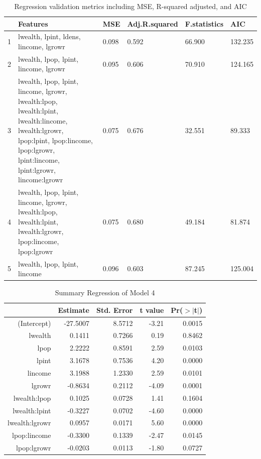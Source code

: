 \documentclass[11pt]{article}\usepackage[]{graphicx}\usepackage[]{color}
\begin{document}
\begin{center}
\begin{table}[ht]
\centering
\begin{tabular}{rp{2in}llll}
  \hline
 & Features & MSE & Adj.R.squared & F.statistics & AIC \\ 
  \hline
1 & lwealth, lpint, ldens, lincome, lgrowr & 0.098 & 0.592 & 66.900 & 132.235 \\ 
  2 & lwealth, lpop, lpint, lincome, lgrowr & 0.095 & 0.606 & 70.910 & 124.165 \\ 
  3 & lwealth, lpop, lpint, lincome, lgrowr, lwealth:lpop, lwealth:lpint, lwealth:lincome, lwealth:lgrowr, lpop:lpint, lpop:lincome, lpop:lgrowr, lpint:lincome, lpint:lgrowr, lincome:lgrowr & 0.075 & 0.676 & 32.551 & 89.333 \\ 
  4 & lwealth, lpop, lpint, lincome, lgrowr, lwealth:lpop, lwealth:lpint, lwealth:lgrowr, lpop:lincome, lpop:lgrowr & 0.075 & 0.680 & 49.184 & 81.874 \\ 
  5 & lwealth, lpop, lpint, lincome & 0.096 & 0.603 & 87.245 & 125.004 \\ 
   \hline
\end{tabular}
\caption{Regression validation metrics including MSE, R-squared adjusted, and AIC} 
\label{reg_vali_metric}
\end{table}

\end{center}

\begin{center}
\begin{table}[ht]
\centering
\begin{tabular}{rrrrr}
  \hline
 & Estimate & Std. Error & t value & Pr($>$$|$t$|$) \\ 
  \hline
(Intercept) & -27.5007 & 8.5712 & -3.21 & 0.0015 \\ 
  lwealth & 0.1411 & 0.7266 & 0.19 & 0.8462 \\ 
  lpop & 2.2222 & 0.8591 & 2.59 & 0.0103 \\ 
  lpint & 3.1678 & 0.7536 & 4.20 & 0.0000 \\ 
  lincome & 3.1988 & 1.2330 & 2.59 & 0.0101 \\ 
  lgrowr & -0.8634 & 0.2112 & -4.09 & 0.0001 \\ 
  lwealth:lpop & 0.1025 & 0.0728 & 1.41 & 0.1604 \\ 
  lwealth:lpint & -0.3227 & 0.0702 & -4.60 & 0.0000 \\ 
  lwealth:lgrowr & 0.0957 & 0.0171 & 5.60 & 0.0000 \\ 
  lpop:lincome & -0.3300 & 0.1339 & -2.47 & 0.0145 \\ 
  lpop:lgrowr & -0.0203 & 0.0113 & -1.80 & 0.0727 \\ 
   \hline
\end{tabular}
\caption{Summary Regression of Model 4} 
\label{reg_summary_4}
\end{table}

\end{center}
\end{document}
